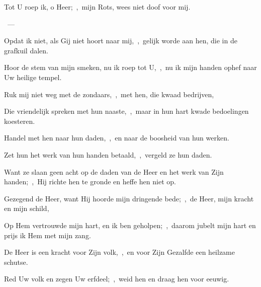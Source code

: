 \documentclass[12pt,twoside,a5paper]{article}
\begin{document}

\begin{halfparskip}
   Tot U roep ik, o Heer;~\sep\ mijn Rots, wees niet doof voor mij.

  ~--- 

  Opdat ik niet, als Gij niet hoort naar mij,~\sep\ gelijk worde aan hen, die in de grafkuil dalen.

  Hoor de stem van mijn smeken, nu ik roep tot U,~\sep\ nu ik mijn handen ophef naar Uw heilige tempel.

  Ruk mij niet weg met de zondaars,~\sep\ met hen, die kwaad bedrijven,

  Die vriendelijk spreken met hun naaste,~\sep\ maar in hun hart kwade bedoelingen koesteren.

  Handel met hen naar hun daden,~\sep\ en naar de boosheid van hun werken.

  Zet hun het werk van hun handen betaald,~\sep\ vergeld ze hun daden.

  Want ze slaan geen acht op de daden van de Heer en het werk van Zijn handen;~\sep\ Hij richte hen te gronde en heffe hen niet op.

  Gezegend de Heer, want Hij hoorde mijn dringende bede;~\sep\ de Heer, mijn kracht en mijn schild,

  Op Hem vertrouwde mijn hart, en ik ben geholpen;~\sep\ daarom jubelt mijn hart en prijs ik Hem met mijn zang.

  De Heer is een kracht voor Zijn volk,~\sep\ en voor Zijn Gezalfde een heilzame schutse.

  Red Uw volk en zegen Uw erfdeel;~\sep\ weid hen en draag hen voor eeuwig.
\end{halfparskip}
\end{document}
